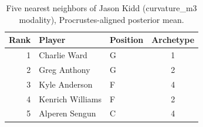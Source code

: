 \begin{table}[htbp]
  \centering\small
  \begin{tabular}{rllc}
    \toprule
    Rank & Player & Position & Archetype \\
    \midrule
    1 & Charlie Ward & G & 1 \\
    2 & Greg Anthony & G & 2 \\
    3 & Kyle Anderson & F & 4 \\
    4 & Kenrich Williams & F & 2 \\
    5 & Alperen Sengun & C & 4 \\
    \bottomrule
  \end{tabular}
  \caption{Five nearest neighbors of Jason Kidd (curvature_m3 modality), Procrustes-aligned posterior mean.}
  \label{tab:Jason_Kidd_neighbors_curvature_m3}
\end{table}

